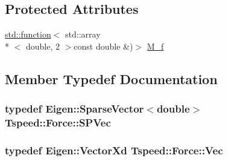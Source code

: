 \subsection*{Protected Attributes}
\begin{DoxyCompactItemize}
\item 
\hyperlink{vtk__vector__out_8m_a6235d6cebbf2f77ca6dbae2811d86530}{std\-::function}$<$ std\-::array\\*
$<$ double, 2 $>$const double \&)$>$ \hyperlink{classTspeed_1_1Force_a71c3dbf2cbca2fe0c4db4db1673794e6}{M\-\_\-f}
\end{DoxyCompactItemize}


\subsection{Member Typedef Documentation}
\hypertarget{classTspeed_1_1Force_a5f4cd0ccfce951a7edded01c87ba6fb6}{
\subsubsection[{S\-P\-Vec}]{\setlength{\rightskip}{0pt plus 5cm}typedef Eigen\-::\-Sparse\-Vector$<$double$>$ {\bf Tspeed\-::\-Force\-::\-S\-P\-Vec}}}\label{classTspeed_1_1Force_a5f4cd0ccfce951a7edded01c87ba6fb6}
\hypertarget{classTspeed_1_1Force_ab33d4f6bed9bf9a136afd1ac5a918c93}{
\subsubsection[{Vec}]{\setlength{\rightskip}{0pt plus 5cm}typedef Eigen\-::\-Vector\-Xd {\bf Tspeed\-::\-Force\-::\-Vec}}}\label{classTspeed_1_1Force_ab33d4f6bed9bf9a136afd1ac5a918c93}


